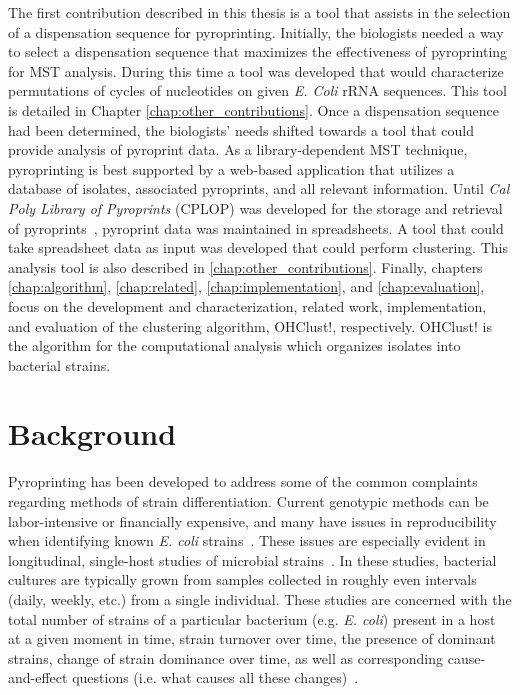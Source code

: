 \documentclass[12pt]{ucthesis}
\begin{document}
   The first contribution described in this thesis is a tool that assists in
   the selection of a dispensation sequence for pyroprinting. Initially, the
   biologists needed a way to select a dispensation sequence that maximizes the
   effectiveness of pyroprinting for MST analysis. During this time a tool was
   developed that would characterize permutations of cycles of nucleotides on
   given \textit{E. Coli} rRNA sequences. This tool is detailed in Chapter
   \ref{chap:other_contributions}. Once a dispensation sequence had been
   determined, the biologists' needs shifted towards a tool that could provide
   analysis of pyroprint data. As a library-dependent MST technique,
   pyroprinting is best supported by a web-based application that utilizes a
   database of isolates, associated pyroprints, and all relevant information.
   Until \textit{Cal Poly Library of Pyroprints} (CPLOP) was developed for the
   storage and retrieval of pyroprints~\cite{Jan:Thesis}, pyroprint data was
   maintained in spreadsheets. A tool that could take spreadsheet data as
   input was developed that could perform clustering. This analysis tool is
   also described in \ref{chap:other_contributions}. Finally, chapters
   \ref{chap:algorithm}, \ref{chap:related}, \ref{chap:implementation}, and
   \ref{chap:evaluation}, focus on the development and characterization,
   related work, implementation, and evaluation of the clustering algorithm,
   \textsf{OHClust!}, respectively. \textsf{OHClust!} is the algorithm for the
   computational analysis which organizes isolates into bacterial strains.

\chapter{Background}\label{chap:background}
   Pyroprinting has been developed to address some of the common complaints
   regarding methods of strain differentiation. Current genotypic methods can
   be labor-intensive or financially expensive, and many have issues in
   reproducibility when identifying known \textit{E. coli}
   strains~\cite{Gordon:StrainTyping, Scott:CurrentMST, Simpson:StateOf}. These
   issues are especially evident in longitudinal, single-host studies of microbial
   strains~\cite{Simpson:StateOf, Anderson:Diversity, Schlager:Clonal}. In
   these studies, bacterial cultures are typically grown from samples collected
   in roughly even intervals (daily, weekly, etc.) from a single individual.
   These studies are concerned with the total number of strains of a particular
   bacterium (e.g. \textit{E. coli}) present in a host at a given moment in
   time, strain turnover over time, the presence of dominant strains, change of
   strain dominance over time, as well as corresponding cause-and-effect
   questions (i.e. what causes all these changes)~\cite{Anderson:Diversity,
   Caugant:Diverse, Sears:Persist, Simpson:StateOf}.
\end{document}
